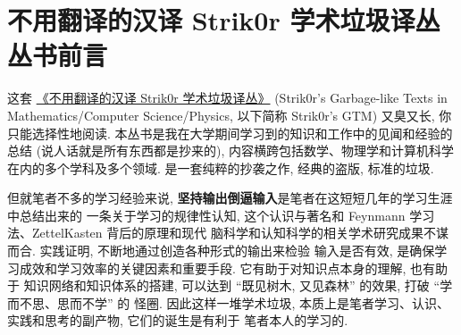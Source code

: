 \chapter*{不用翻译的汉译 Strik0r 学术垃圾译丛 \quad 丛书前言}
\setcounter{page}{1}
\thispagestyle{empty}

这套
\href{https://github.com/Strik0r-QF/Strik0r-s_GTM}{《不用翻译的汉译 Strik0r 学术垃圾译丛》}
(Strik0r's Garbage-like Texts in Mathematics/Computer Science/Physics, 以下简称 Strik0r's GTM)
又臭又长, 你只能选择性地阅读.
本丛书是我在大学期间学习到的知识和工作中的见闻和经验的总结 (说人话就是所有东西都是抄来的), 
内容横跨包括数学、物理学和计算机科学在内的多个学科及多个领域. 是一套纯粹的抄袭之作, 
经典的盗版, 标准的垃圾.

但就笔者不多的学习经验来说, \textbf{坚持输出倒逼输入}是笔者在这短短几年的学习生涯中总结出来的
一条关于学习的规律性认知, 这个认识与著名和 Feynmann 学习法、ZettelKasten 背后的原理和现代
脑科学和认知科学的相关学术研究成果不谋而合. 实践证明, 不断地通过创造各种形式的输出来检验
输入是否有效, 是确保学习成效和学习效率的关键因素和重要手段. 它有助于对知识点本身的理解, 也有助于
知识网络和知识体系的搭建, 可以达到 “既见树木, 又见森林” 的效果, 打破 “学而不思、思而不学” 的
怪圈. 因此这样一堆学术垃圾, 本质上是笔者学习、认识、实践和思考的副产物, 它们的诞生是有利于
笔者本人的学习的.

